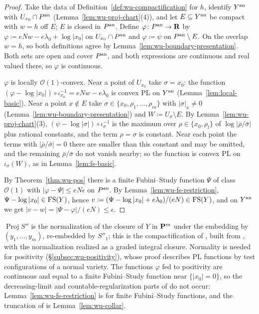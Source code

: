 \begin{proof}
Take the data of Definition~\ref{def:wu-compactification} for $h$, identify $Y^{\mathrm{an}}$ with $U_{x_0}\cap P^{\mathrm{an}}$
(Lemma~\ref{lem:wu-proj-chart}(4)), and let $E\subseteq Y^{\mathrm{an}}$ be compact with $w=h$ off $E$; $E$ is closed in
$P^{\mathrm{an}}$. Define $\varphi\colon P^{\mathrm{an}}\to\mathbf{R}$ by $\varphi\coloneqq eNw-e\lambda_0+\log|x_0|$ on $U_{x_0}\cap P^{\mathrm{an}}$ and
$\varphi\coloneqq\psi$ on $P^{\mathrm{an}}\setminus E$. On the overlap $w=h$, so both definitions agree by
Lemma~\ref{lem:wu-boundary-presentation}. Both sets are open and cover $P^{\mathrm{an}}$, and both expressions are continuous
and real valued there, so $\varphi$ is continuous.

$\varphi$ is locally $\mathcal O(1)$-convex. Near a point of $U_{x_0}$ take $\sigma=x_0$: the function
$(\varphi-\log|x_0|)\circ\iota_{x_0}^{-1}=eNw-e\lambda_0$ is convex PL on $Y^{\mathrm{an}}$ (Lemma~\ref{lem:local-basic}). Near a
point $x\notin E$ take $\sigma\in\{x_0,\rho_1,\dots,\rho_m\}$ with $|\sigma|_x\ne0$ (Lemma~\ref{lem:wu-boundary-presentation})
and $W\coloneqq U_\sigma\setminus E$. By Lemma~\ref{lem:wu-proj-chart}(3), $(\psi-\log|\sigma|)\circ\iota_\sigma^{-1}$ is the
maximum over $\rho\in\{x_0,\rho_l\}$ of $\log|\bar\rho/\bar\sigma|$ plus rational constants, and the term $\rho=\sigma$ is
constant. Near each point the terms with $|\bar\rho/\bar\sigma|=0$ there are smaller than this constant and may be omitted,
and the remaining $\bar\rho/\bar\sigma$ do not vanish nearby; so the function is convex PL on $\iota_\sigma(W)$, as in
Lemma~\ref{lem:fs-basic}.

By Theorem~\ref{thm:wu-pos} there is a finite Fubini--Study function $\Psi$ of class $\mathcal O(1)$ with
$|\varphi-\Psi|\le eN\epsilon$ on $P^{\mathrm{an}}$. By Lemma~\ref{lem:wu-fs-restriction}, $\Psi-\log|x_0|\in\mathrm{FS}(Y)$, hence
$v\coloneqq(\Psi-\log|x_0|+e\lambda_0)/(eN)\in\mathrm{FS}(Y)$, and on $Y^{\mathrm{an}}$ we get $|v-w|=|\Psi-\varphi|/(eN)\le\epsilon$.
\end{proof}

\begin{remark}\label{rmk:wu-compactification}
$\operatorname{Proj}S''$ is the normalization of the closure of $Y$ in $\mathbf{P}^m$ under the embedding by
$(y_1,\dots,y_m)$, re-embedded by $S''_1$; this is the compactification of \cite[Lemma~5.9]{FHX}, built from
\cite[Proposition~3.17(2)]{Wu26}, with the normalization realized as a graded integral closure. Normality is needed
for positivity (\S\ref{subsec:wu-positivity}), whose proof describes PL functions by test configurations of a normal
variety. The functions $\varphi$ fed to positivity are continuous and equal to a finite Fubini--Study function near
$\{|x_0|=0\}$, so the decreasing-limit and countable-regularization parts of \cite[Lemma~5.10]{FHX} do not occur:
Lemma~\ref{lem:wu-fs-restriction} is \cite[Lemma~5.10(1)]{FHX} for finite Fubini--Study functions, and the truncation of
\cite[Lemma~5.10(2)]{FHX} is Lemma~\ref{lem:wu-collar}.
\end{remark}

